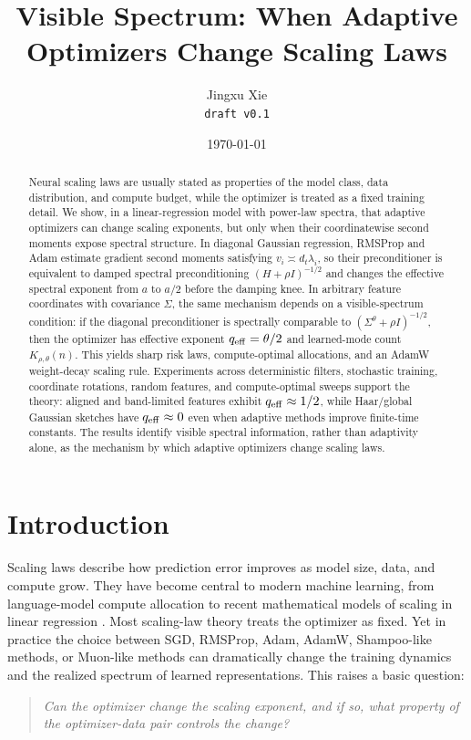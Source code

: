 \documentclass[11pt]{article}
\title{Visible Spectrum: When Adaptive Optimizers Change Scaling Laws}
\author{Jingxu Xie\\\texttt{draft v0.1}}
\date{\today}
\begin{document}
\maketitle

\begin{abstract}
Neural scaling laws are usually stated as properties of the model class, data distribution, and compute budget, while the optimizer is treated as a fixed training detail.  We show, in a linear-regression model with power-law spectra, that adaptive optimizers can change scaling exponents, but only when their coordinatewise second moments expose spectral structure.  In diagonal Gaussian regression, RMSProp and Adam estimate gradient second moments satisfying $v_i\asymp d_t\lambda_i$, so their preconditioner is equivalent to damped spectral preconditioning $(H+\rho I)^{-1/2}$ and changes the effective spectral exponent from $a$ to $a/2$ before the damping knee.  In arbitrary feature coordinates with covariance $\Sigma$, the same mechanism depends on a visible-spectrum condition: if the diagonal preconditioner is spectrally comparable to $(\Sigma^\theta+\rho I)^{-1/2}$, then the optimizer has effective exponent $q_{\rm eff}=\theta/2$ and learned-mode count $K_{\rho,\theta}(n)$.  This yields sharp risk laws, compute-optimal allocations, and an AdamW weight-decay scaling rule.  Experiments across deterministic filters, stochastic training, coordinate rotations, random features, and compute-optimal sweeps support the theory: aligned and band-limited features exhibit $q_{\rm eff}\approx1/2$, while Haar/global Gaussian sketches have $q_{\rm eff}\approx0$ even when adaptive methods improve finite-time constants.  The results identify visible spectral information, rather than adaptivity alone, as the mechanism by which adaptive optimizers change scaling laws.
\end{abstract}

\section{Introduction}

Scaling laws describe how prediction error improves as model size, data, and compute grow.  They have become central to modern machine learning, from language-model compute allocation \citep{kaplan2020scaling,hoffmann2022chinchilla} to recent mathematical models of scaling in linear regression \citep{lin2024scaling,lin2025reuse}.  Most scaling-law theory treats the optimizer as fixed.  Yet in practice the choice between SGD, RMSProp, Adam, AdamW, Shampoo-like methods, or Muon-like methods can dramatically change the training dynamics and the realized spectrum of learned representations.  This raises a basic question:
\begin{quote}
\emph{Can the optimizer change the scaling exponent, and if so, what property of the optimizer-data pair controls the change?}
\end{quote}
\end{document}
